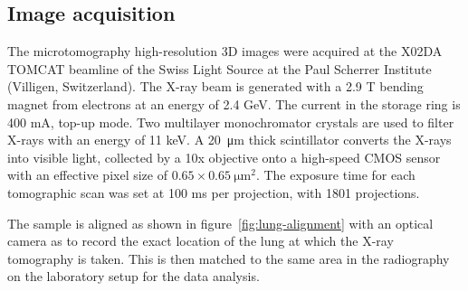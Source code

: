 \subsection{Image acquisition}\label{sec:acquisition}
The microtomography high-resolution 3D images were acquired at the X02DA
TOMCAT beamline of the Swiss Light Source at the Paul Scherrer Institute
(Villigen, Switzerland). The X-ray beam is generated with a 2.9 T bending
magnet from electrons at an energy of 2.4 GeV. The current in the storage
ring is 400 mA, top-up mode. Two multilayer monochromator crystals are used
to filter X-rays with an energy of 11 keV. A \SI{20}{\micro\meter} thick scintillator
converts the X-rays into visible light, collected by a 10x objective onto a
high-speed CMOS sensor with an effective pixel size of $0.65 \times
\SI{0.65}{\micro\meter\squared}$. The exposure time for each tomographic
scan was set at 100 ms per projection, with 1801 projections.

The sample is aligned as shown in figure~\ref{fig:lung-alignment} with an
optical camera as to record the exact location of the lung at which the X-ray
tomography is taken. This is then matched to the same area in the
radiography on the laboratory setup for the data analysis.

